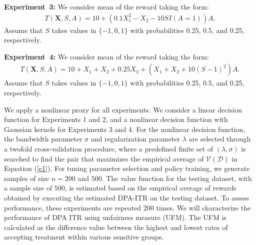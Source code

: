 \documentclass[12pt]{article}
\theoremstyle{plain}
\theoremstyle{definition}
\theoremstyle{remark}
\begin{document}
\noindent\textbf{Experiment\ 3:}
We consider mean of the reward taking the form:
\begin{equation*}
\begin{aligned}
T(\boldsymbol{X}, S,A)=10+\left(0.1X_1^2-X_2-10SI(A=1)\right)A.
\end{aligned}
\end{equation*}
Assume that $S$ takes values in $\{-1, 0, 1\}$ with probabilities 0.25, 0.5, and 0.25, respectively.


\noindent\textbf{Experiment\ 4:}
We consider mean of the reward taking the form:
 \begin{equation*}
\begin{aligned}
T(\boldsymbol{X}, S,A)=10+ X_1+X_2+0.25 X_3+\left(X_1+X_2+10(S-1)^2\right)A.
\end{aligned}
\end{equation*}
Assume that $S$ takes values in $\{-1, 0, 1\}$ with probabilities 0.25, 0.5, and 0.25, respectively.



We apply a nonlinear proxy for all experiments. We consider a linear decision function for Experiments 1 and 2, and a nonlinear decision function with Gaussian kernels for Experiments 3 and 4. For the nonlinear decision function, the bandwidth parameter $\sigma$ and regularization parameter $\lambda$ are selected through a twofold cross-validation procedure, where a predefined finite set of $(\lambda, \sigma)$ is searched to find the pair that maximizes the empirical average of $\mathcal{V}(\mathcal{D})$ in Equation (\ref{e1}). For tuning parameter selection and policy training, we generate samples of size $n=200$ and $500$. The value function for the testing dataset, with a sample size of $500$, is estimated based on the empirical average of rewards obtained by executing the estimated DPA-ITR on the testing dataset. To assess performance, these experiments are repeated 200 times.  We will characterize the performance of DPA ITR using unfairness measure (UFM). The UFM is calculated as the difference value between the highest and lowest rates of accepting treatment within various sensitive groups.
\end{document}

